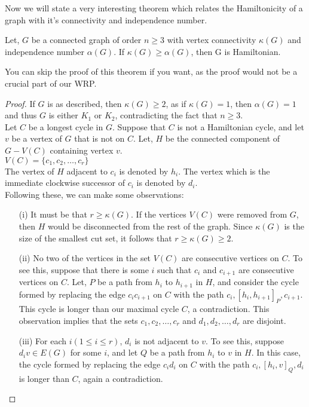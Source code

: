 \documentclass[../basic_graph_theory.tex]{subfiles}
\begin{document}
Now we will state a very interesting theorem which relates the Hamiltonicity of a graph with it's connectivity and independence number.

\begin{Thm}{}{}
    Let, $G$ be a connected graph of order $n \ge 3$ with vertex connectivity $\kappa(G)$ and independence number $\alpha(G)$. If $\kappa(G) \ge \alpha(G)$, then G is Hamiltonian.
\end{Thm}
You can skip the proof of this theorem if you want, as the proof would not be a crucial part of our WRP.
\begin{proof}
    If $G$ is as described, then $\kappa(G) \ge 2$, as if $\kappa(G)=1$, then $\alpha(G)=1$ and thus $G$ is either $K_1$ or $K_2$, contradicting the fact that $n \ge 3$.\\
    Let $C$ be a longest cycle in $G$. Suppose that $C$ is not a Hamiltonian cycle, and let $v$ be a vertex of $G$ that is not on $C$. Let, $H$ be the connected component of $G-V(C)$ containing vertex $v$.\\
    $V(C)=\{c_1,c_2,\dots,c_r\}$\\
    The vertex of $H$ adjacent to $c_i$ is denoted by $h_i$. The vertex which is the immediate clockwise successor of $c_i$ is denoted by $d_i$.\\
    Following these, we can make some observations:\\
    \begin{enumerate}
        \item[(i)] It must be that $r \ge \kappa(G)$. If the vertices $V(C)$ were removed from $G$, then $H$ would be disconnected from the rest of the graph. Since $\kappa(G)$ is the size of the smallest cut set, it follows that $r \ge \kappa(G) \ge 2$.
        \item[(ii)] No two of the vertices in the set $V(C)$ are consecutive vertices on $C$. To see this, suppose that there is some $i$ such that $c_i$ and $c_{i+1}$ are consecutive vertices on $C$. Let, $P$ be a path from $h_i$ to $h_{i+1}$ in $H$, and consider the cycle formed by replacing the edge $c_ic_{i+1}$ on $C$ with the path $c_i, [h_i, h_{i+1}]_{P} , c_{i+1}$. This cycle is longer than our maximal cycle $C$, a contradiction. This observation implies that the sets ${c_1, c_2,\dots,c_r}$ and ${d_1, d_2,\dots,d_r}$ are disjoint.
        \item[(iii)] For each $i (1 \le i \le r)$, $d_i$ is not adjacent to $v$. To see this, suppose $d_{i}v \in E(G)$ for some $i$, and let $Q$ be a path from $h_i$ to $v$ in $H$. In this case, the cycle formed by replacing the edge $c_{i}d_{i}$ on $C$ with the path $c_{i}, [h_{i}, v]_{Q}, d_{i}$ is longer than $C$, again a contradiction.

\end{enumerate}
\end{proof}
\end{document}
